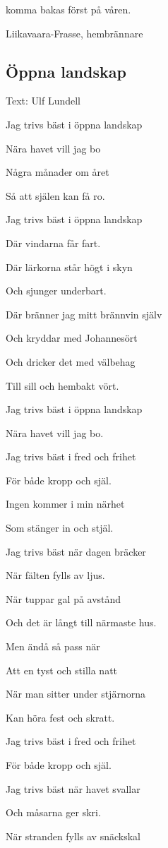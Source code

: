 komma bakas först på våren.

Liikavaara-Frasse, hembrännare\bigskip


\subsection{\textbf{Öppna landskap}}

Text: Ulf Lundell\bigskip


Jag trivs bäst i öppna landskap

Nära havet vill jag bo

Några månader om året

Så att själen kan få ro.

Jag trivs bäst i öppna landskap

Där vindarna får fart.

Där lärkorna står högt i skyn

Och sjunger underbart.

Där bränner jag mitt brännvin själv

Och kryddar med Johannesört

Och dricker det med välbehag

Till sill och hembakt vört.

Jag trivs bäst i öppna landskap

Nära havet vill jag bo. \bigskip


Jag trivs bäst i fred och frihet

För både kropp och själ.

Ingen kommer i min närhet

Som stänger in och stjäl.

Jag trivs bäst när dagen bräcker

När fälten fylls av ljus.

När tuppar gal på avstånd

Och det är långt till närmaste hus.

Men ändå så pass när

Att en tyst och stilla natt

När man sitter under stjärnorna

Kan höra fest och skratt.

Jag trivs bäst i fred och frihet

För både kropp och själ. \bigskip


Jag trivs bäst när havet svallar

Och måsarna ger skri.

När stranden fylls av snäckskal


